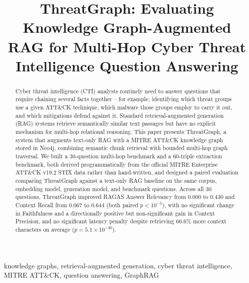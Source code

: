 \documentclass[conference]{IEEEtran}
\begin{document}
\title{ThreatGraph: Evaluating Knowledge Graph-Augmented RAG for Multi-Hop Cyber Threat Intelligence Question Answering}

\author{
}

\maketitle

\begin{abstract}
Cyber threat intelligence (CTI) analysts routinely need to answer questions
that require chaining several facts together -- for example, identifying
which threat groups use a given ATT\&CK technique, which malware those
groups employ to carry it out, and which mitigations defend against it.
Standard retrieval-augmented generation (RAG) systems retrieve semantically
similar text passages but have no explicit mechanism for multi-hop
relational reasoning. This paper presents ThreatGraph, a system that
augments text-only RAG with a MITRE ATT\&CK knowledge graph stored in Neo4j,
combining semantic chunk retrieval with bounded multi-hop graph traversal.
We built a 30-question multi-hop benchmark and a 60-triple extraction
benchmark, both derived programmatically from the official MITRE Enterprise
ATT\&CK v19.2 STIX data rather than hand-written, and designed a paired
evaluation comparing ThreatGraph against a text-only RAG baseline on the
same corpus, embedding model, generation model, and benchmark questions.
Across all 30 questions, ThreatGraph improved RAGAS Answer Relevancy from
0.000 to 0.430 and Context Recall from 0.067 to 0.644 (both paired
$p<10^{-5}$), with no significant change in Faithfulness and a
directionally positive but non-significant gain in Context Precision, and
no significant latency penalty despite retrieving 66.6\% more context
characters on average ($p=5.1\times10^{-30}$).
\end{abstract}

\begin{IEEEkeywords}
knowledge graphs, retrieval-augmented generation, cyber threat intelligence, MITRE ATT\&CK, question answering, GraphRAG
\end{IEEEkeywords}
\end{document}
